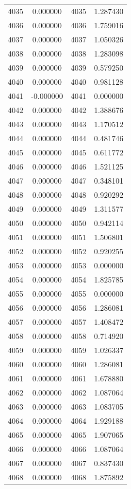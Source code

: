 \documentclass[12pt]{article}
\begin{document}
\begin{longtable}{@{}cccc@{}}
4035 & 0.000000 & 4035 & 1.287430 \\
4036 & 0.000000 & 4036 & 1.759016 \\
4037 & 0.000000 & 4037 & 1.050326 \\
4038 & 0.000000 & 4038 & 1.283098 \\
4039 & 0.000000 & 4039 & 0.579250 \\
4040 & 0.000000 & 4040 & 0.981128 \\
4041 & -0.000000 & 4041 & 0.000000 \\
4042 & 0.000000 & 4042 & 1.388676 \\
4043 & 0.000000 & 4043 & 1.170512 \\
4044 & 0.000000 & 4044 & 0.481746 \\
4045 & 0.000000 & 4045 & 0.611772 \\
4046 & 0.000000 & 4046 & 1.521125 \\
4047 & 0.000000 & 4047 & 0.348101 \\
4048 & 0.000000 & 4048 & 0.920292 \\
4049 & 0.000000 & 4049 & 1.311577 \\
4050 & 0.000000 & 4050 & 0.942114 \\
4051 & 0.000000 & 4051 & 1.506801 \\
4052 & 0.000000 & 4052 & 0.920255 \\
4053 & 0.000000 & 4053 & 0.000000 \\
4054 & 0.000000 & 4054 & 1.825785 \\
4055 & 0.000000 & 4055 & 0.000000 \\
4056 & 0.000000 & 4056 & 1.286081 \\
4057 & 0.000000 & 4057 & 1.408472 \\
4058 & 0.000000 & 4058 & 0.714920 \\
4059 & 0.000000 & 4059 & 1.026337 \\
4060 & 0.000000 & 4060 & 1.286081 \\
4061 & 0.000000 & 4061 & 1.678880 \\
4062 & 0.000000 & 4062 & 1.087064 \\
4063 & 0.000000 & 4063 & 1.083705 \\
4064 & 0.000000 & 4064 & 1.929188 \\
4065 & 0.000000 & 4065 & 1.907065 \\
4066 & 0.000000 & 4066 & 1.087064 \\
4067 & 0.000000 & 4067 & 0.837430 \\
4068 & 0.000000 & 4068 & 1.875892 \\

\end{longtable}
\end{document}
